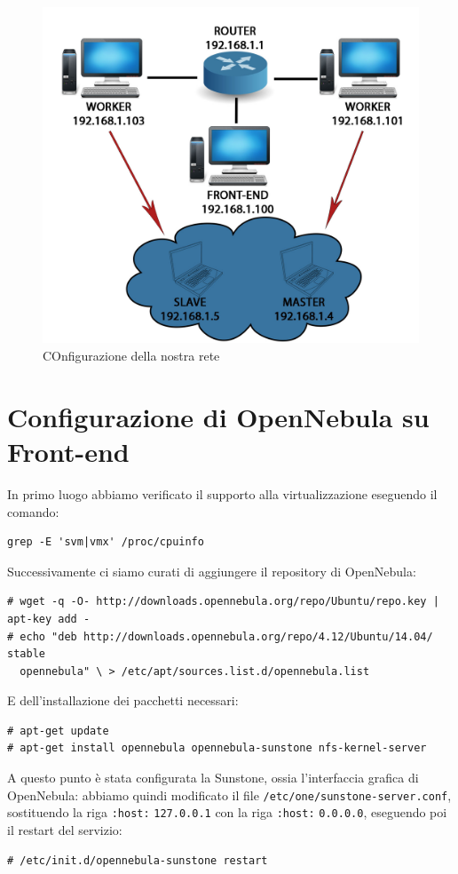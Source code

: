 \documentclass[twoside]{article}
\begin{document}
\begin{figure}[!tbp]
\centering
\includegraphics[width=13cm]{immagine4.jpg}
\caption{COnfigurazione della nostra rete}\label{fig:4}
\end{figure}

\section{Configurazione di OpenNebula su Front-end}
In primo luogo abbiamo verificato il supporto alla virtualizzazione eseguendo il comando:
\begin{lstlisting}[frame=trBL]
grep -E 'svm|vmx' /proc/cpuinfo
\end{lstlisting}

Successivamente ci siamo curati di aggiungere il repository di OpenNebula:
\begin{lstlisting}[frame=trBL]
# wget -q -O- http://downloads.opennebula.org/repo/Ubuntu/repo.key | apt-key add -
# echo "deb http://downloads.opennebula.org/repo/4.12/Ubuntu/14.04/ stable 
  opennebula" \ > /etc/apt/sources.list.d/opennebula.list
\end{lstlisting}

E dell'installazione dei pacchetti necessari:
\begin{lstlisting}[frame=trBL]
# apt-get update
# apt-get install opennebula opennebula-sunstone nfs-kernel-server
\end{lstlisting}

A questo punto è stata configurata la Sunstone, ossia l'interfaccia grafica di OpenNebula:
abbiamo quindi modificato il file 
\texttt{/etc/one/sunstone-server.conf}, sostituendo la riga \texttt{:host:} \texttt{127.0.0.1}
con la riga \texttt{:host:} \texttt{0.0.0.0}, eseguendo poi il restart del servizio:
\begin{lstlisting}[frame=trBL]
# /etc/init.d/opennebula-sunstone restart
\end{lstlisting}
\end{document}
